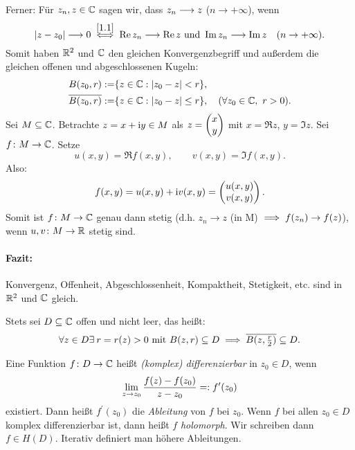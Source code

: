 \documentclass[a4paper,twoside,DIV15,BCOR12mm]{scrbook}
\begin{document}
\begin{center}
\end{center}

Ferner: Für $z_n,z\in\mathbb{C}$ sagen wir, dass $z_n\longrightarrow z$ ($n\to+\infty$), wenn
\[\left\lvert z-z_0\right\lvert\longrightarrow 0\overset{\eqref{1.1}}{\iff} \operatorname{Re}{z_n}\longrightarrow\operatorname{Re}{z}\text{ und }\operatorname{Im}{z_n}\longrightarrow\operatorname{Im}{z}\quad(n\to+\infty).\]
Somit haben $\mathbb{R}^2$ und $\mathbb{C}$ den gleichen Konvergenzbegriff und außerdem die gleichen offenen und abgeschlossenen Kugeln:
\begin{align*}
B(z_0,r):=&\{z\in\mathbb{C}: \left\lvert z_0-z\right\lvert < r\},\\
\overline{B(z_0,r)}:=&\{z\in\mathbb{C}: \left\lvert z_0-z\right\lvert \leq r\},\quad(\forall z_0\in\mathbb{C},\ r>0).
\end{align*}
Sei $M\subseteq\mathbb{C}$. Betrachte $z=x+\mathrm{i} y\in M$ als $z = \left(\!\!\!\begin{array}{c}x\\y\end{array}\!\!\!\right)$ mit $x = \Re{z}$, $y = \Im{z}$. Sei $f\colon M\to\mathbb{C}$. Setze
\[u(x,y) = \Re{f(x,y)},\qquad v(x,y) = \Im{f(x,y)}.\]
Also:
\[f(x,y) = u(x,y) + \mathrm{i} v(x,y) = \left(\!\!\!\begin{array}{c}u(x,y)\\v(x,y)\end{array}\!\!\!\right).\]
Somit ist $f\colon M\to\mathbb{C}$ genau dann stetig (d.h. $z_n\to z$ (in M) $\implies f(z_n)\to f(z)$), wenn $u,v\colon M\to\mathbb{R}$ stetig sind.

\paragraph{Fazit:} Konvergenz, Offenheit, Abgeschlossenheit, Kompaktheit, Stetigkeit, etc. sind in $\mathbb{R}^2$ und $\mathbb{C}$ gleich.

Stets sei $D\subseteq\mathbb{C}$ offen und nicht leer, das heißt:
\[\forall z\in D\exists\: r = r(z)>0\text{ mit }B(z,r)\subseteq D\implies\overline{B(z,\tfrac{r}{2})}\subseteq D.\]

\begin{dfn} \label{dfn1.1}
  Eine Funktion $f\colon D \to \mathbb{C}$ heißt \emph{(komplex) differenzierbar} in $z_0 \in D$, wenn
  \[\lim_{z\to z_0}{\frac{f(z)-f(z_0)}{z-z_0}} =: f^\prime(z_0)\]
  existiert. Dann heißt $f^\prime(z_0)$ die \emph{Ableitung} von $f$ bei $z_0$. Wenn $f$ bei allen $z_0\in D$ komplex
  differenzierbar ist, dann heißt $f$ \emph{holomorph}. Wir schreiben dann $f\in H(D)$. Iterativ definiert man höhere
  Ableitungen.
\end{dfn}
\end{document}
